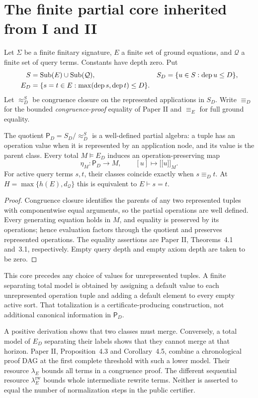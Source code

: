 \section{The finite partial core inherited from I and II}\label{sec:finitecore}

Let $\Sigma$ be a finite finitary signature, $E$ a finite set of ground equations, and $\mathcal Q$ a finite set of query terms. Constants have depth zero. Put
\begin{align*}
S&=\operatorname{Sub}(E)\cup\operatorname{Sub}(\mathcal Q),&
S_D&=\{u\in S:\operatorname{dep} u\le D\},\\
E_D&=\{s=t\in E:\max(\operatorname{dep} s,\operatorname{dep} t)\le D\}.&&
\end{align*}
Let $\approx_D^S$ be congruence closure on the represented applications in $S_D$. Write $\equiv_D$ for the bounded \emph{congruence-proof} equality of Paper II and $\equiv_E$ for full ground equality.

\begin{proposition}\label{prop:core}
The quotient $\mathsf P_D=S_D/\!\approx_D^S$ is a well-defined partial algebra: a tuple has an operation value when it is represented by an application node, and its value is the parent class. Every total $M\models E_D$ induces an operation-preserving map
\[
\eta_M:\mathsf P_D\to M,\qquad [u]\mapsto\lbrack\!\lbrack u\rbrack\!\rbrack_M.
\]
For active query terms $s,t$, their classes coincide exactly when $s\equiv_D t$. At $H=\max\{h(E),d_{\mathcal Q}\}$ this is equivalent to $E\vdash s=t$.
\end{proposition}
\begin{proof}
Congruence closure identifies the parents of any two represented tuples with componentwise equal arguments, so the partial operations are well defined. Every generating equation holds in $M$, and equality is preserved by its operations; hence evaluation factors through the quotient and preserves represented operations. The equality assertions are Paper II, Theorems~4.1 and~3.1, respectively. Empty query depth and empty axiom depth are taken to be zero.
\end{proof}

This core precedes any choice of values for unrepresented tuples. A finite separating total model is obtained by assigning a default value to each unrepresented operation tuple and adding a default element to every empty active sort. That totalization is a certificate-producing construction, not additional canonical information in $\mathsf P_D$.

A positive derivation shows that two classes must merge. Conversely, a total model of $E_D$ separating their labels shows that they cannot merge at that horizon. Paper II, Proposition~4.3 and Corollary~4.5, combine a chronological proof DAG at the first complete threshold with such a lower model. Their resource $\lambda_E$ bounds all terms in a congruence proof. The different sequential resource $\lambda_E^{\mathrm{rw}}$ bounds whole intermediate rewrite terms. Neither is asserted to equal the number of normalization steps in the public certifier.

